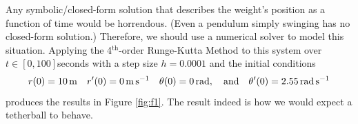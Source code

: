 \documentclass{article}
\newcommand{\0}{\vb{0}}
\begin{document}
Any symbolic/closed-form solution that describes the weight's position as a function of time would be horrendous. (Even a pendulum simply swinging has no closed-form solution.) Therefore, we should use a numerical solver to model this situation. Applying the 4$^\mathrm{th}$-order Runge-Kutta Method to this system over $t \in [0, 100]$seconds with a step size $h = 0.0001$ and the initial conditions 
\[r(0) = \SI{10}{\meter} \quad r'(0) = \SI{0}{\meter\per\second} \quad \theta(0) = \SI{0}{\radian}, \qq{and} \theta'(0) = \SI{2.55}{\radian\per\second}\]
produces the results in Figure \ref{fig:f1}. The result indeed is how we would expect a tetherball to behave.

\nocite{burdenc2011}
\nocite{greenbaum2012}
\nocite{press2007}
\nocite{suli2010}


\end{document}
